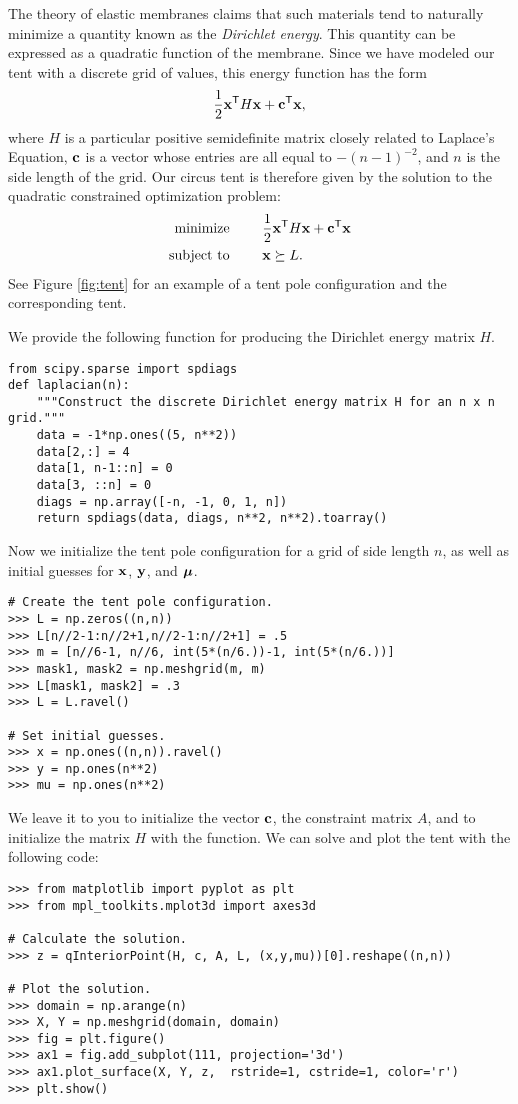 The theory of elastic membranes claims that such materials tend to naturally minimize a quantity known as the \emph{Dirichlet energy}.
This quantity can be expressed as a quadratic function of the membrane.
Since we have modeled our tent with a discrete grid of values, this energy function has the form \[\frac{1}{2}\mathbf{x}^{\mathsf T}  H \mathbf{x} + \mathbf{c}^{\mathsf T}  \mathbf{x},\] where $H$ is a particular positive semidefinite matrix closely related to Laplace's Equation, $\mathbf{c}$ is a vector whose entries are all equal to $-(n-1)^{-2}$, and $n$ is the side length of the grid.
Our circus tent is therefore given by the solution to the quadratic constrained optimization problem:
\begin{align*}
\text{minimize }\qquad &\frac{1}{2}\mathbf{x}^{\mathsf T}  H \mathbf{x} + \mathbf{c}^{\mathsf T}  \mathbf{x}\\
\text{subject to }\qquad &\mathbf{x} \succeq L.\\
\end{align*}
See Figure \ref{fig:tent} for an example of a tent pole configuration and the corresponding tent.

We provide the following function for producing the Dirichlet energy matrix $H$.
\begin{lstlisting}
from scipy.sparse import spdiags
def laplacian(n):
    """Construct the discrete Dirichlet energy matrix H for an n x n grid."""
    data = -1*np.ones((5, n**2))
    data[2,:] = 4
    data[1, n-1::n] = 0
    data[3, ::n] = 0
    diags = np.array([-n, -1, 0, 1, n])
    return spdiags(data, diags, n**2, n**2).toarray()
\end{lstlisting}
Now we initialize the tent pole configuration for a grid of side length $n$, as well as initial guesses for $\mathbf{x}$, $\mathbf{y}$, and $\boldsymbol{\mu}$.
\begin{lstlisting}
# Create the tent pole configuration.
>>> L = np.zeros((n,n))
>>> L[n//2-1:n//2+1,n//2-1:n//2+1] = .5
>>> m = [n//6-1, n//6, int(5*(n/6.))-1, int(5*(n/6.))]
>>> mask1, mask2 = np.meshgrid(m, m)
>>> L[mask1, mask2] = .3
>>> L = L.ravel()

# Set initial guesses.
>>> x = np.ones((n,n)).ravel()
>>> y = np.ones(n**2)
>>> mu = np.ones(n**2)
\end{lstlisting}
We leave it to you to initialize the vector $\mathbf{c}$, the constraint matrix $A$,
and to initialize the matrix $H$ with the  function.
We can solve and plot the tent with the following code:
\begin{lstlisting}
>>> from matplotlib import pyplot as plt
>>> from mpl_toolkits.mplot3d import axes3d

# Calculate the solution.
>>> z = qInteriorPoint(H, c, A, L, (x,y,mu))[0].reshape((n,n))

# Plot the solution.
>>> domain = np.arange(n)
>>> X, Y = np.meshgrid(domain, domain)
>>> fig = plt.figure()
>>> ax1 = fig.add_subplot(111, projection='3d')
>>> ax1.plot_surface(X, Y, z,  rstride=1, cstride=1, color='r')
>>> plt.show()
\end{lstlisting}

